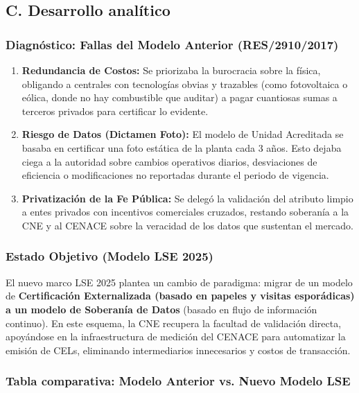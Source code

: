 \documentclass{cel}
\begin{document}
\subsection{C. Desarrollo analítico}
\nopagebreak

\subsubsection{Diagnóstico: Fallas del Modelo Anterior (RES/2910/2017)}
\nopagebreak

\begin{enumerate}
\item \textbf{Redundancia de Costos:} Se priorizaba la burocracia sobre la física, obligando a centrales con tecnologías obvias y trazables (como fotovoltaica o eólica, donde no hay combustible que auditar) a pagar cuantiosas sumas a terceros privados para certificar lo evidente.
\item \textbf{Riesgo de Datos (Dictamen \textquotedbl{}Foto\textquotedbl{}):} El modelo de Unidad Acreditada se basaba en certificar una \textquotedbl{}foto\textquotedbl{} estática de la planta cada 3 años. Esto dejaba ciega a la autoridad sobre cambios operativos diarios, desviaciones de eficiencia o modificaciones no reportadas durante el periodo de vigencia.
\item \textbf{Privatización de la Fe Pública:} Se delegó la validación del atributo \textquotedbl{}limpio\textquotedbl{} a entes privados con incentivos comerciales cruzados, restando soberanía a la CNE y al CENACE sobre la veracidad de los datos que sustentan el mercado.

\end{enumerate}
\subsubsection{Estado Objetivo (Modelo LSE 2025)}
\nopagebreak

El nuevo marco LSE 2025 plantea un cambio de paradigma: migrar de un modelo de \textbf{Certificación Externalizada \textbf{ (basado en papeles y visitas esporádicas) a un modelo de }Soberanía de Datos} (basado en flujo de información continuo). En este esquema, la CNE recupera la facultad de validación directa, apoyándose en la infraestructura de medición del CENACE para automatizar la emisión de CELs, eliminando intermediarios innecesarios y costos de transacción.


\vspace{0.4cm}
\subsubsection{Tabla comparativa: Modelo Anterior vs. Nuevo Modelo LSE}
\nopagebreak
\end{document}
